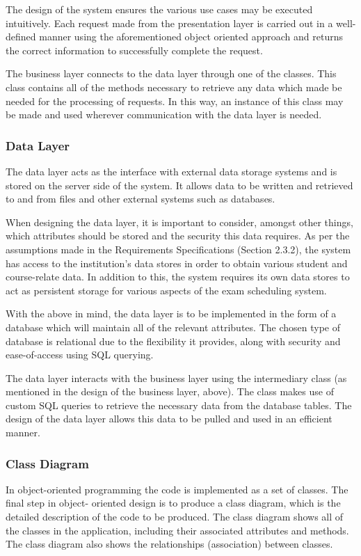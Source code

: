 \documentclass{article}
\begin{document}
The design of the system ensures the various use cases may be executed intuitively. Each request made from the presentation layer is carried out in a well-defined manner using the aforementioned object oriented approach and returns the correct information to successfully complete the request.

The business layer connects to the data layer through one of the classes. This class contains all of the methods necessary to retrieve any data which made be needed for the processing of requests. In this way, an instance of this class may be made and used wherever communication with the data layer is needed.

\subsubsection{Data Layer}
The data layer acts as the interface with external data storage systems and is stored on the server side of the system. It allows data to be written and
retrieved to and from files and other external systems such as databases.

When designing the data layer, it is important to consider, amongst other things, which attributes should be
stored and the security this data requires. As per the assumptions made in the Requirements Specifications (Section 2.3.2), the system has access to the institution's data stores in order to obtain various student and course-relate data. In addition to this, the system requires its own data stores to act as persistent storage for various aspects of the exam scheduling system.

With the above in mind, the data layer is to be implemented in the form of a database which will maintain all of the relevant attributes. The chosen type of database is relational due to the flexibility it provides, along with security and ease-of-access using SQL querying.

The data layer interacts with the business layer using the intermediary class (as mentioned in the design of the business layer, above). The class makes use of custom SQL queries to retrieve the necessary data from the database tables. The design of the data layer allows this data to be pulled and used in an efficient manner.

\subsubsection{Class Diagram}

In object-oriented programming the code is implemented as a set of classes. The final step in object-
oriented design is to produce a class diagram, which is the detailed description of the code to be produced.
The class diagram shows all of the classes in the application, including their associated attributes and
methods. The class diagram also shows the relationships (association) between classes.
\bigskip
\end{document}
